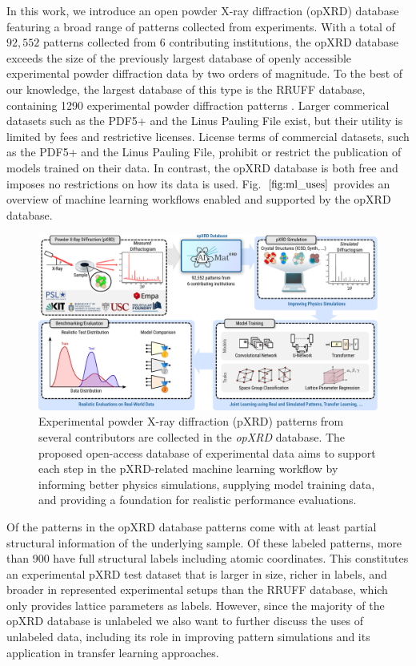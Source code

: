 In this work, we introduce an open powder X-ray diffraction (opXRD) database featuring a broad range of patterns collected from experiments. With a total of $92,552$ patterns collected from 6 contributing institutions, the opXRD database exceeds the size of the previously largest database of openly accessible experimental powder diffraction data by two orders of magnitude. To the best of our knowledge, the largest database of this type is the RRUFF database, containing 1290 experimental powder diffraction patterns \cite{lafuente2015}. Larger commerical datasets such as the PDF5+\cite{GatesRector2019} and the Linus Pauling File\cite{villars2018} exist, but their utility is limited by fees and restrictive licenses. License terms of commercial datasets, such as the PDF5+ and the Linus Pauling File, prohibit or restrict the publication of models trained on their data. In contrast, the opXRD database is both free and imposes no restrictions on how its data is used. Fig.~$\eqref{fig:ml_uses}$ provides an overview of machine learning workflows enabled and supported by the opXRD database.

\begin{figure}[!htb]
    \centering
    \includegraphics[width=1.0\linewidth]{figures/pipeline.pdf}
    \caption{Experimental powder X-ray diffraction (pXRD) patterns from several contributors are collected in the \textit{opXRD} database. The proposed open-access database of experimental data aims to support each step in the pXRD-related machine learning workflow by informing better physics simulations, supplying model training data, and providing a foundation for realistic performance evaluations.}
    \label{fig:ml_uses}
\end{figure}

Of the \numpatterns patterns in the opXRD database \numlabeled patterns come with at least partial structural information of the underlying sample. Of these \numlabeled labeled patterns, more than 900 have full structural labels including atomic coordinates. This constitutes an experimental pXRD test dataset that is larger in size, richer in labels, and broader in represented experimental setups than the RRUFF database, which only provides lattice parameters as labels\cite{Armbruster2015}. However, since the majority of the opXRD database is unlabeled we also want to further discuss the uses of unlabeled data, including its role in improving pattern simulations and its application in transfer learning approaches.

